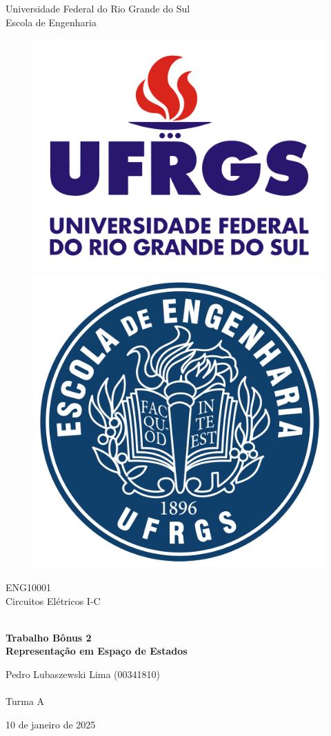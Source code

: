 \documentclass{report}
\begin{document}
    \begin{titlepage}
        \centering
        
        \LARGE {Universidade Federal do Rio Grande do Sul \\ Escola de Engenharia}
    
        \begin{figure}[h!]
        \centering
        \subfigure
        {\includegraphics[width=0.35\linewidth]{images/logos/UFRGS.png}}
        \hspace{1cm}
        \subfigure
        {\includegraphics[width=0.3\linewidth]{images/logos/EE.png}}
        \end{figure}
    
        \LARGE {ENG10001 \\ Circuitos Elétricos I-C}
        
        \vfill
        {\noindent\hrulefill \\
        \bfseries \Huge{Trabalho Bônus 2} \\ \LARGE{Representação em Espaço de Estados} \\
        \noindent\hrulefill}
        
        \vfill
        {\LARGE Pedro Lubaszewski Lima (00341810) \\~\\ Turma A}
    
        \vfill
        {\LARGE 10 de janeiro de 2025}
        
    \end{titlepage}

        \renewcommand{\contentsname}{Sumário}
        \tableofcontents
        \clearpage
\end{document}
